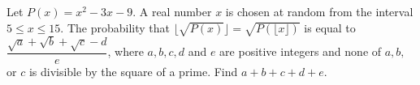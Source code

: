 Let $P(x)=x^2-3x-9$. A real number $x$ is chosen at random from the interval $5\leq x \leq 15$. The probability that $\lfloor \sqrt{P(x)} \rfloor = \sqrt{P(\lfloor x \rfloor )}$ is equal to $\dfrac{\sqrt{a}+\sqrt{b}+\sqrt{c}-d}{e}$, where $a,b,c,d$ and $e$ are positive integers and none of $a,b,$ or $c$ is divisible by the square of a prime. Find $a+b+c+d+e$.
